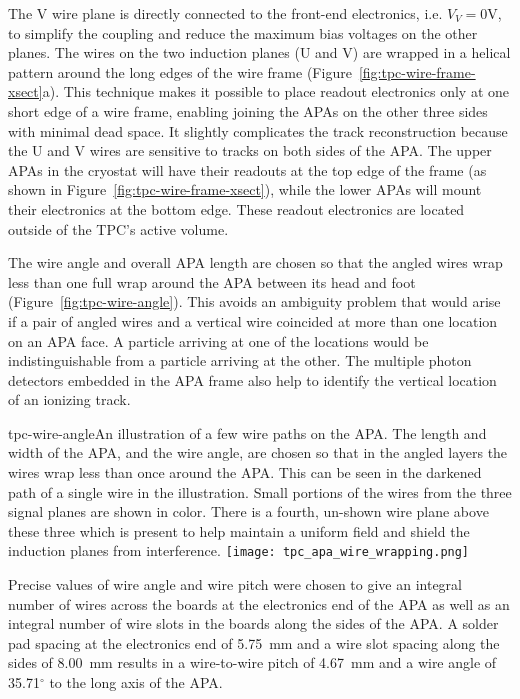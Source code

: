 The V wire plane is directly connected to the front-end electronics, i.e. $V_V=0$V, to simplify the coupling and 
reduce the maximum bias voltages on the other planes. The wires on the two induction planes (U and V) are wrapped in a helical pattern around the long edges of the wire frame 
(Figure~\ref{fig:tpc-wire-frame-xsect}a). This technique makes it possible to place readout 
electronics only at one short edge of a wire frame, enabling joining the APAs on the other three sides with minimal dead space.  It slightly complicates 
the track reconstruction because the U and V wires are sensitive to tracks on 
both sides of the APA.  The upper APAs in the cryostat will have their readouts
at the top edge of the frame (as shown in Figure~\ref{fig:tpc-wire-frame-xsect}), 
while the lower APAs will mount their electronics at the bottom edge.  These readout electronics are located outside of the TPC's active volume.

The wire angle and overall APA length are chosen so that the angled wires wrap less than one full wrap around the APA between its head and foot (Figure~\ref{fig:tpc-wire-angle}).  This avoids an ambiguity problem that would arise if a pair of angled wires and a vertical wire coincided at more than one location on an APA face.  A particle arriving at one of the locations would be indistinguishable from a particle arriving at the other.  The multiple photon detectors embedded in the APA frame also help to identify the vertical location of an ionizing track.

\begin{cdrfigure}{tpc-wire-angle}{An illustration of a few wire paths on the APA.  The length and width of the APA, and the wire angle, are chosen so that in the angled layers the wires wrap less than once around the APA.  This can be seen in the darkened path of a single wire in the illustration.  Small portions of the wires from the three signal planes are shown in color.  There is a fourth, un-shown wire plane above these three which is present to help maintain a uniform field and shield the induction planes from interference.}
\texttt{[image: tpc\_apa\_wire\_wrapping.png]}
\end{cdrfigure}



Precise values of wire angle and wire pitch were chosen to give an integral number of wires across the boards at the electronics end of the APA as well as an integral number of wire slots in the boards along the sides of the APA.  A solder pad spacing at the electronics end of 5.75~mm and a wire slot spacing along the sides of 8.00~mm results in a wire-to-wire pitch of 4.67~mm and a wire angle of 35.71$^\circ$ to the long axis of the APA.


